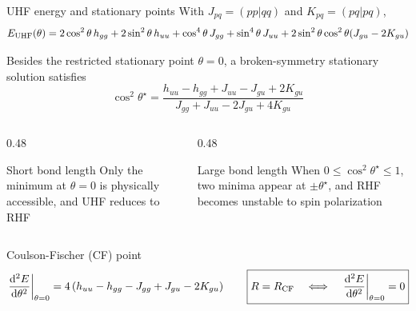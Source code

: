 \documentclass[aspectratio=169,9pt]{beamer}
\newcommand{\rbraket}[2]{( #1 | #2 )}
\begin{document}
\begin{frame}{UHF energy and stationary points}
	With $J_{pq}=\rbraket{pp}{qq}$ and $K_{pq}=\rbraket{pq}{pq}$,
	\begin{equation*}
		E_\text{UHF}(\theta)
		=
		2\cos^2\theta\,h_{gg}
		+2\sin^2\theta\,h_{uu}
		+\cos^4\theta\,J_{gg}
		+\sin^4\theta\,J_{uu}
		+2\sin^2\theta\cos^2\theta
		\qty(J_{gu}-2K_{gu})
	\end{equation*}

	Besides the restricted stationary point $\theta=0$, a \alert{broken-symmetry stationary solution} satisfies
	\begin{equation*}
		\boxed{
			\cos^2 \theta^\star
			=
			\frac{
				h_{uu}-h_{gg}+J_{uu}-J_{gu}+2K_{gu}
			}{
				J_{gg}+J_{uu}-2J_{gu}+4K_{gu}
			}
		}
	\end{equation*}

	\begin{columns}[T,onlytextwidth]
		\begin{column}{0.48\textwidth}
			\begin{block}{Short bond length}
				Only the minimum at $\theta=0$ is physically accessible, and UHF reduces to RHF
			\end{block}
		\end{column}
		\begin{column}{0.48\textwidth}
			\begin{block}{Large bond length}
				When $0 \le \cos^2 \theta^\star \le 1$, two minima appear at $\pm\theta^\star$, and RHF becomes unstable to spin polarization
			\end{block}
		\end{column}
	\end{columns}
	\begin{block}{Coulson-Fischer (CF) point}
    	\begin{equation*}
    		\eval{\dv[2]{E}{\theta}}_{\theta=0}
    		=
    		4\left(h_{uu}-h_{gg}-J_{gg}+J_{gu}-2K_{gu}\right)
			\qquad
    		\boxed{
    			R=R_\text{CF}
    			\quad\Longleftrightarrow\quad
    			\eval{\dv[2]{E}{\theta}}_{\theta=0}=0
    		}
    	\end{equation*}
	\end{block}
\end{frame}
\end{document}
